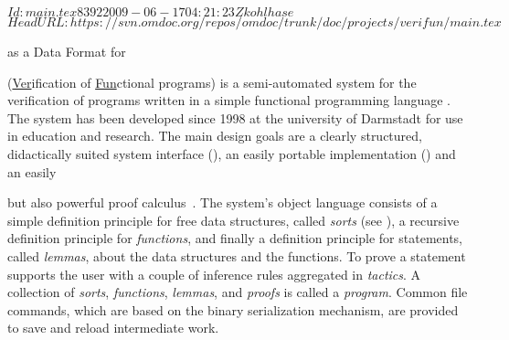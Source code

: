 \svnInfo $Id: main.tex 8392 2009-06-17 04:21:23Z kohlhase $
\svnKeyword $HeadURL: https://svn.omdoc.org/repos/omdoc/trunk/doc/projects/verifun/main.tex $

\begin{omgroup}[id=verifun,short=VeriFun,creators={nmueller}]
  {{\omdoc} as a Data Format for {\verifun}}


{\verifun} (\underline{Ver}ification of \underline{Fun}ctional programs) is a
semi-automated system for the verification of programs written in a simple functional
programming language {\fp}. The system has been developed since 1998 at the university of
Darmstadt for use in education and research. The main design goals are a clearly
structured, didactically suited system interface (), an easily portable
implementation ({\java}) and an easily
\begin{wrapfigure}{r}{8cm}\vspace*{-.3cm}
  \texttt{[image: \\projectsPath\{verifun/verifun]}}
  \label{fig:verifun}\caption{A {\verifun} session}\vspace*{-.3cm}
\end{wrapfigure}
but also powerful proof calculus~\cite{WS:VFTut}. The system's object language consists of
a simple definition principle for free data structures, called {\emph{sorts}} (see
{}), a recursive definition principle for {\emph{functions}}, and
finally a definition principle for statements, called {\emph{lemmas}}, about the data
structures and the functions. To prove a statement {\verifun} supports the user with a
couple of inference rules aggregated in {\emph{tactics}}. A collection of {\emph{sorts}},
{\emph{functions}}, {\emph{lemmas}}, and {\emph{proofs}} is called a {\verifun}
{\emph{program}}. Common file commands, which are based on the {\java} binary
serialization mechanism, are provided to save and reload intermediate work.


\end{omgroup}
